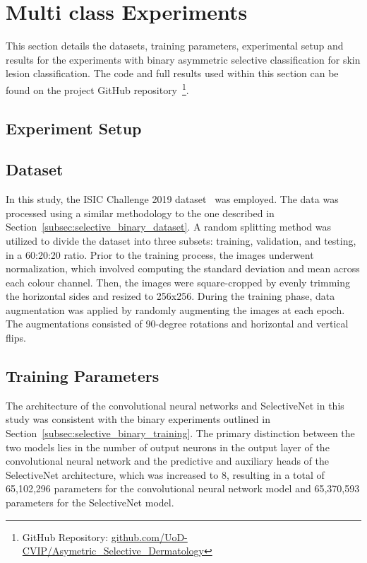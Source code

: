 \section{Multi class Experiments}
\label{sec:selective_multi_class_experiments}
This section details the datasets, training parameters, experimental setup and results for the experiments with binary asymmetric selective classification for skin lesion classification. The code and full results used within this section can be found on the project GitHub repository~\footnote{GitHub Repository: \url{github.com/UoD-CVIP/Asymetric_Selective_Dermatology}}.

\subsection{Experiment Setup}

\subsection{Dataset}
In this study, the ISIC Challenge 2019 dataset~\citep{codella2018skin,combalia2019bcn20000,tschandl2018ham10000} was employed. The data was processed using a similar methodology to the one described in Section~\ref{subsec:selective_binary_dataset}. A random splitting method was utilized to divide the dataset into three subsets: training, validation, and testing, in a 60:20:20 ratio. Prior to the training process, the images underwent normalization, which involved computing the standard deviation and mean across each colour channel. Then, the images were square-cropped by evenly trimming the horizontal sides and resized to 256x256. During the training phase, data augmentation was applied by randomly augmenting the images at each epoch. The augmentations consisted of 90-degree rotations and horizontal and vertical flips.

\subsection{Training Parameters}
The architecture of the convolutional neural networks and SelectiveNet in this study was consistent with the binary experiments outlined in Section~\ref{subsec:selective_binary_training}. The primary distinction between the two models lies in the number of output neurons in the output layer of the convolutional neural network and the predictive and auxiliary heads of the SelectiveNet architecture, which was increased to 8, resulting in a total of 65,102,296 parameters for the convolutional neural network model and 65,370,593 parameters for the SelectiveNet model.

